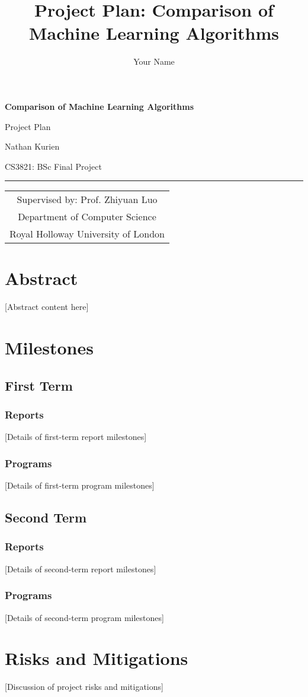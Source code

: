 \documentclass[a4paper,12pt]{article}
\title{Project Plan: Comparison of Machine Learning Algorithms}
\author{Your Name}
\date{} %
\renewcommand{\maketitle}{
  \begin{center}
    {\LARGE\textbf{Comparison of Machine Learning Algorithms}}\par
    {\Large Project Plan}\par
    \vspace{10pt}
    Nathan Kurien\par
    CS3821: BSc Final Project\par
    \hrule %
    \vspace{10pt}
    \begin{tabular}{c}
      Supervised by: Prof. Zhiyuan Luo \\
      Department of Computer Science \\
      Royal Holloway University of London
    \end{tabular}
  \end{center}
}
\begin{document}
\maketitle

\section{Abstract}

[Abstract content here]

\section{Milestones}
\subsection{First Term}
\subsubsection{Reports}
[Details of first-term report milestones]

\subsubsection{Programs}
[Details of first-term program milestones]

\subsection{Second Term}
\subsubsection{Reports}
[Details of second-term report milestones]

\subsubsection{Programs}
[Details of second-term program milestones]

\section{Risks and Mitigations}
[Discussion of project risks and mitigations]
\end{document}
